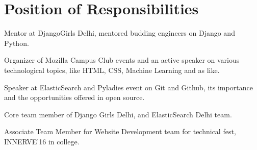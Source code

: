 \documentclass[]{hieudo-build}
\begin{document}
\begin{minipage}[t]{0.69\textwidth}
\section{Position of Responsibilities}

\vspace{0.5em} 
\begin{tightemize}
\item Mentor at DjangoGirls Delhi, mentored budding engineers on Django and Python.
\item Organizer of Mozilla Campus Club events and an active speaker on various technological topics, like HTML, CSS, Machine Learning and as like.
\item Speaker at ElasticSearch and Pyladies event on Git and Github, its importance and the opportunities offered in open source.
\item Core team member of Django Girls Delhi, and ElasticSearch Delhi team.
\item Associate Team Member for Website Development team for technical fest, INNERVE'16 in college.
\end{tightemize}
\sectionsep


\end{minipage} 
\end{document}
